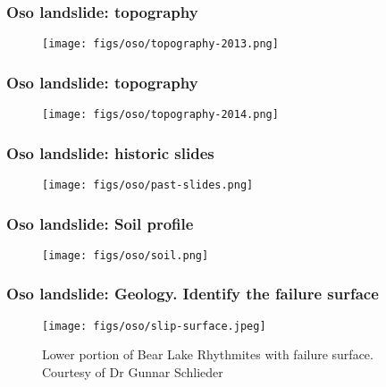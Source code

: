 \documentclass[handout]{beamer}
\begin{document}


\begin{frame}
	\frametitle{Oso landslide: topography}
	\begin{figure}
		\texttt{[image: figs/oso/topography-2013.png]}
	\end{figure}
\end{frame}

\begin{frame}
	\frametitle{Oso landslide: topography}
	\begin{figure}
		\texttt{[image: figs/oso/topography-2014.png]}
	\end{figure}
\end{frame}

\begin{frame}
	\frametitle{Oso landslide: historic slides}
	\begin{figure}
		\texttt{[image: figs/oso/past-slides.png]}
	\end{figure}
\end{frame}

\begin{frame}
	\frametitle{Oso landslide: Soil profile}
	\begin{figure}
		\texttt{[image: figs/oso/soil.png]}
	\end{figure}
\end{frame}

\begin{frame}
	\frametitle{Oso landslide: Geology. Identify the failure surface}
	\begin{figure}
		\texttt{[image: figs/oso/slip-surface.jpeg]}
		\caption*{Lower portion of Bear Lake Rhythmites with failure surface. Courtesy of Dr Gunnar Schlieder}
	\end{figure}
\end{frame}
\end{document}
